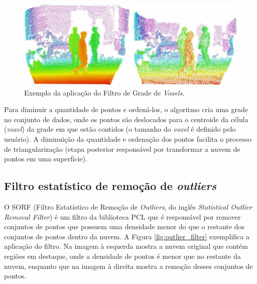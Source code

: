 \begin{figure}[H]
    \centering
    \includegraphics[scale=0.4]{dados/figuras/voxelgrid_filter.png}
    \caption{Exemplo da aplicação do Filtro de Grade de \textit{Voxels}.}
    \vspace{-0.8em}
    \label{fig:voxelgrid_filter}
\end{figure}

Para diminuir a quantidade de pontos e ordená-los, o algoritmo cria uma grade no conjunto de dados, onde os pontos são deslocados para o centroide da célula (\textit{voxel}) da grade em que estão contidos (o tamanho do \textit{voxel} é definido pelo usuário). A diminuição da quantidade e ordenação dos pontos facilita o processo de triangularização (etapa posterior responsável por transformar a nuvem de pontos em uma superfície).

\subsection{Filtro estatístico de remoção de \textit{outliers}}
\label{sec:statistical_outlier_removal}

O SORF (Filtro Estatístico de Remoção de \textit{Outliers}, do inglês \textit{Statistical Outlier Removal Filter}) é um filtro da biblioteca PCL que é responsável por remover conjuntos de pontos que possuem uma densidade menor do que o restante dos conjuntos de pontos dentro da nuvem. 
A Figura \ref{fig:outlier_filter} exemplifica a aplicação do filtro. Na imagem à esquerda mostra a nuvem original que contém regiões em destaque, onde a densidade de pontos é menor que no restante da nuvem, enquanto que na imagem à direita mostra a remoção desses conjuntos de pontos.

